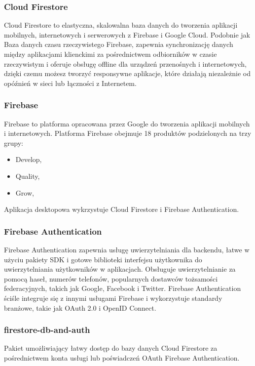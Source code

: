 \documentclass[12pt,a4paper]{article}
\begin{document}
				\subsubsection{Cloud Firestore}

					\indent	Cloud Firestore to elastyczna, skalowalna baza danych do tworzenia aplikacji mobilnych, internetowych i serwerowych z Firebase i Google Cloud.
					Podobnie jak Baza danych czasu rzeczywistego Firebase, zapewnia synchronizację danych między aplikacjami klienckimi za pośrednictwem odbiorników w czasie
					rzeczywistym i oferuje obsługę offline dla urządzeń przenośnych i internetowych, dzięki czemu możesz tworzyć responsywne aplikacje, które działają niezależnie
					od opóźnień w sieci lub łączności z Internetem.
				\subsubsection{Firebase}

					\indent Firebase to platforma opracowana przez Google do tworzenia aplikacji mobilnych i internetowych. Platforma Firebase obejmuje 18 produktów podzielonych
					na trzy grupy:
					\begin{itemize}
						\item Develop,
						\item Quality,
						\item Grow,
					\end{itemize}
					Aplikacja desktopowa wykrzystuje Cloud Firestore i Firebase Authentication.
				\subsubsection{Firebase Authentication}

					\indent	Firebase Authentication zapewnia usługę uwierzytelniania dla backendu, łatwe w użyciu pakiety SDK i gotowe biblioteki interfejsu użytkownika
					do uwierzytelniania użytkowników w aplikacjach. Obsługuje uwierzytelnianie za pomocą haseł, numerów telefonów, popularnych dostawców tożsamości
					federacyjnych, takich jak Google, Facebook i Twitter. Firebase Authentication ściśle integruje się z innymi usługami Firebase i wykorzystuje standardy
					branżowe, takie jak OAuth 2.0 i OpenID Connect.								
				\subsubsection{firestore-db-and-auth}

					\indent Pakiet umożliwiający łatwy dostęp do bazy danych Cloud Firestore za pośrednictwem konta usługi lub poświadczeń OAuth Firebase Authentication.				
\end{document}
